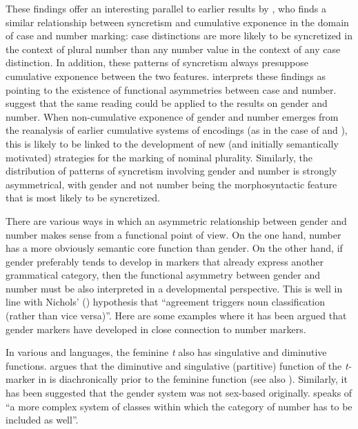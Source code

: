 \documentclass[output=collectionpaper]{langsci/langscibook}
\begin{document}
These findings offer an interesting parallel to earlier results by \cite{Carstairs1987}, who finds a similar relationship between syncretism and cumulative exponence in the domain of case and number marking: case distinctions are more likely to be syncretized in the context of plural number than any number value in the context of any case distinction. In addition, these patterns of syncretism always presuppose cumulative exponence between the two features. \cite{Carstairs1987} interprets these findings as pointing to the existence of functional asymmetries between case and number. \cite[205--206]{DiGarbo2018a} suggest that the same reading could be applied to the results on gender and number. When non-cumulative exponence of gender and number emerges from the reanalysis of earlier cumulative systems of encodings (as in the case of  and ), this is likely to be linked to the development of new (and initially semantically motivated) strategies for the marking of nominal plurality. Similarly, the distribution of patterns of syncretism involving gender and number is strongly asymmetrical, with gender \textendash{} and not number \textendash{} being the morphosyntactic feature that is most likely to be syncretized.

There are various ways in which an asymmetric relationship between gender and number makes sense from a functional point of view. On the one hand, number has a more obviously semantic core function than gender. On the other hand, if gender preferably tends to develop in markers that already express another grammatical category, then the functional asymmetry between gender and number must be also interpreted in a developmental perspective. This is well in line with Nichols' (\citealt*[142]{Nichols1992}) hypothesis that ``agreement triggers noun classification (rather than vice versa)''. Here are some examples where it has been argued that gender markers have developed in close connection to number markers.

In various  and  languages, the feminine \textit{t} also has singulative and diminutive functions. \cite[221]{Mettouchi2000} argues that the diminutive and singulative (partitive) function of the \textit{t-} marker in  is diachronically prior to the feminine function (see also ). Similarly, it has been suggested that the  gender system was not sex-based originally. \cite[86]{Moscati1964} speaks of ``a more complex system of classes within which the category of number has to be included as well''.
\end{document}
